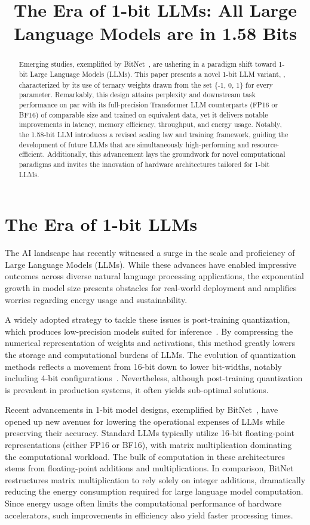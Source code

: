 \title{The Era of 1-bit LLMs: All Large Language Models are in 1.58 Bits}

\begin{abstract}
Emerging studies, exemplified by BitNet~\cite{bitnet}, are ushering in a paradigm shift toward 1-bit Large Language Models (LLMs). This paper presents a novel 1-bit LLM variant, \textbf{}, characterized by its use of ternary weights drawn from the set \{-1, 0, 1\} for every parameter. Remarkably, this design attains perplexity and downstream task performance on par with its full-precision Transformer LLM counterparts (FP16 or BF16) of comparable size and trained on equivalent data, yet it delivers notable improvements in latency, memory efficiency, throughput, and energy usage. Notably, the 1.58-bit LLM introduces a revised scaling law and training framework, guiding the development of future LLMs that are simultaneously high-performing and resource-efficient. Additionally, this advancement lays the groundwork for novel computational paradigms and invites the innovation of hardware architectures tailored for 1-bit LLMs.
\end{abstract}

\section{The Era of 1-bit LLMs}

The AI landscape has recently witnessed a surge in the scale and proficiency of Large Language Models (LLMs). While these advances have enabled impressive outcomes across diverse natural language processing applications, the exponential growth in model size presents obstacles for real-world deployment and amplifies worries regarding energy usage and sustainability. 

A widely adopted strategy to tackle these issues is post-training quantization, which produces low-precision models suited for inference~\cite{smoothquant, gptq, quip, quip_sharp}. By compressing the numerical representation of weights and activations, this method greatly lowers the storage and computational burdens of LLMs. The evolution of quantization methods reflects a movement from 16-bit down to lower bit-widths, notably including 4-bit configurations~\cite{gptq, awq}. Nevertheless, although post-training quantization is prevalent in production systems, it often yields sub-optimal solutions.

Recent advancements in 1-bit model designs, exemplified by BitNet~\cite{bitnet}, have opened up new avenues for lowering the operational expenses of LLMs while preserving their accuracy. Standard LLMs typically utilize 16-bit floating-point representations (either FP16 or BF16), with matrix multiplication dominating the computational workload. The bulk of computation in these architectures stems from floating-point additions and multiplications. In comparison, BitNet restructures matrix multiplication to rely solely on integer additions, dramatically reducing the energy consumption required for large language model computation. Since energy usage often limits the computational performance of hardware accelerators, such improvements in efficiency also yield faster processing times.

